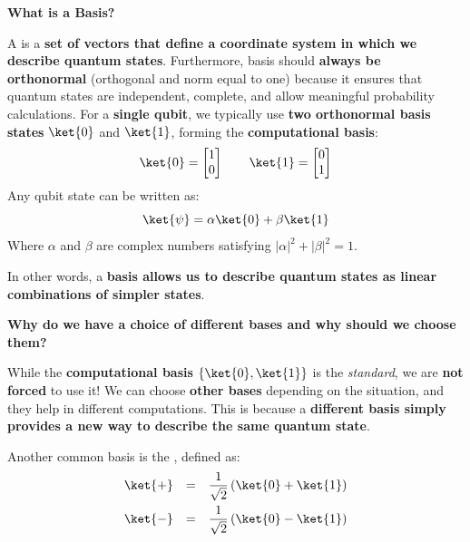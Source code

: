 \highspace
\begin{flushleft}
    \textcolor{Green3}{ \textbf{What is a Basis?}}
\end{flushleft}
A  is a \textbf{set of vectors that define a coordinate system in which we describe quantum states}. Furthermore, basis should \textbf{always be orthonormal} (orthogonal and norm equal to one) because it ensures that quantum states are independent, complete, and allow meaningful probability calculations. For a \textbf{single qubit}, we typically use \textbf{two orthonormal basis states} $\ket{0}$ and $\ket{1}$, forming the \textbf{computational basis}:
\begin{equation*}
    \ket{0} = \begin{bmatrix}1\\0\end{bmatrix}
    \hspace{2em}
    \ket{1} = \begin{bmatrix}0\\1\end{bmatrix}
\end{equation*}
Any qubit state can be written as:
\begin{equation*}
    \ket{\psi} = \alpha \ket{0} + \beta \ket{1}
\end{equation*}
Where $\alpha$ and $\beta$ are complex numbers satisfying $\left|\alpha\right|^{2} + \left|\beta\right|^{2} = 1$.

\highspace
In other words, a \textbf{basis allows us to describe quantum states as linear combinations of simpler states}.

\highspace
\begin{flushleft}
    \textcolor{Green3}{ \textbf{Why do we have a choice of different bases and why should we choose them?}}
\end{flushleft}
While the \textbf{computational basis} $\left\{\ket{0}, \ket{1}\right\}$ is the \emph{standard}, we are \textbf{not forced} to use it! We can choose \textbf{other bases} depending on the situation, and they help in different computations. This is because a \textbf{different basis simply provides a new way to describe the same quantum state}.

\highspace
Another common basis is the , defined as:
\begin{equation*}
    \begin{array}{rcl}
        \ket{+} &=& \dfrac{1}{\sqrt{2}}\left(\ket{0} + \ket{1}\right) \\ [1em]
        \ket{-} &=& \dfrac{1}{\sqrt{2}}\left(\ket{0} - \ket{1}\right)
    \end{array}
\end{equation*}

